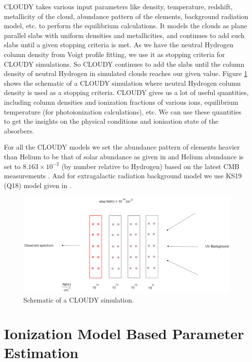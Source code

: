 CLOUDY takes various input parameters like density, temperature, redshift, metallicity of the cloud, abundance pattern of the elements, background radiation model, etc. to perform the equilibrium calculations. It models the clouds as plane parallel slabs with uniform densities and metallicities, and continues to add such slabs until a given stopping criteria is met. As we have the neutral Hydrogen column density from Voigt profile fitting, we use it as stopping criteria for CLOUDY simulations. So CLOUDY continues to add the slabs until the column density of neutral Hydrogen in simulated clouds reaches our given value.
Figure \ref{fig:Cloudy} shows the schematic of a CLOUDY simulation where neutral Hydrogen column density is used as a stopping criteria.
CLOUDY gives us a lot of useful quantities, including column densities and ionization fractions of various ions, equilibrium temperature (for photoionization calculations), etc. We can use these quantities to get the insights on the physical conditions and ionisation state of the absorbers. 

For all the CLOUDY models we set the abundance pattern of elements heavier than Helium to be that of solar abundance as given in \citet{grevesse-chemical-2010} and Helium abundance is set to $8.163\times{10}^{-2}$ (by number relative to Hydrogen) based on the latest CMB measurements \citep{planck_collaboration_planck_2020}. And for extragalactic radiation background model we use KS19 (Q18) model given in \cite{KS19}.  

\begin{figure}[!htbp]
    \centering
    \includegraphics[width=\textwidth]{Figures/Cloudy.png}
    \caption{Schematic of a CLOUDY simulation.}
    \label{fig:Cloudy}
\end{figure}


\section{Ionization Model Based Parameter Estimation}  \label{sec:param-estimation}

